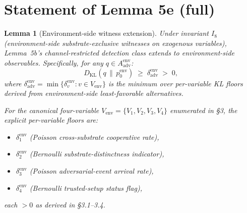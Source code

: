 \documentclass{article}
\newtheorem{lemma}{Lemma}
\newcommand{\Aadv}{A_{\mathrm{adv}}}
\newcommand{\deltaadv}{\delta_{\mathrm{adv}}}
\begin{document}
\section{Statement of Lemma 5e (full)}

\begin{lemma}[Environment-side witness extension]
\label{lem:5e}
Under invariant $I_8$ (environment-side substrate-exclusive
witnesses on exogenous variables), Lemma~5b's channel-restricted
detection class extends to environment-side observables.
Specifically, for any $q \in \Aadv^{\mathrm{env}}$:
\[
  D_{\mathrm{KL}}(q \,\|\, p_0^{\mathrm{env}}) \;\geq\;
  \deltaadv^{\mathrm{env}} \;>\; 0,
\]
where $\deltaadv^{\mathrm{env}} = \min\{\delta_v^{\mathrm{env}} :
v \in V_{\mathrm{env}}\}$ is the minimum over per-variable KL
floors derived from environment-side least-favorable alternatives.

For the canonical four-variable $V_{\mathrm{env}} = \{V_1, V_2,
V_3, V_4\}$ enumerated in §3, the explicit per-variable floors are:
\begin{itemize}
\item $\delta_1^{\mathrm{env}}$ (Poisson cross-substrate cooperative
  rate),
\item $\delta_2^{\mathrm{env}}$ (Bernoulli substrate-distinctness
  indicator),
\item $\delta_3^{\mathrm{env}}$ (Poisson adversarial-event arrival
  rate),
\item $\delta_4^{\mathrm{env}}$ (Bernoulli trusted-setup status
  flag),
\end{itemize}
each $> 0$ as derived in §3.1--3.4.
\end{lemma}
\end{document}

